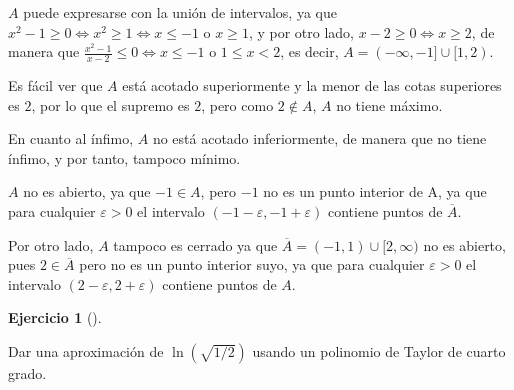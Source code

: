 \documentclass[
  spanish,
  a4paper,
]{scrreport}
\theoremstyle{definition}
\newtheorem{exercise}{Ejercicio}[chapter]
\theoremstyle{remark}
\begin{document}
\begin{tcolorbox}[enhanced jigsaw, arc=.35mm, bottomrule=.15mm, bottomtitle=1mm, breakable, colback=white, colbacktitle=quarto-callout-tip-color!10!white, colframe=quarto-callout-tip-color-frame, coltitle=black, left=2mm, leftrule=.75mm, opacityback=0, opacitybacktitle=0.6, rightrule=.15mm, title=\textcolor{quarto-callout-tip-color}{\faLightbulb}\hspace{0.5em}{Solución}, titlerule=0mm, toprule=.15mm, toptitle=1mm]

\(A\) puede expresarse con la unión de intervalos, ya que
\(x^2-1\geq 0 \Leftrightarrow x^2\geq 1 \Leftrightarrow x\leq -1 \mbox{ o } x\geq 1\),
y por otro lado, \(x-2\geq 0 \Leftrightarrow x\geq 2\), de manera que
\(\frac{x^2-1}{x-2}\leq 0 \Leftrightarrow x\leq -1\) o \(1\leq x<2\), es
decir, \(A=(-\infty,-1]\cup [1,2)\).

Es fácil ver que \(A\) está acotado superiormente y la menor de las
cotas superiores es \(2\), por lo que el supremo es \(2\), pero como
\(2\not\in A\), \(A\) no tiene máximo.

En cuanto al ínfimo, \(A\) no está acotado inferiormente, de manera que
no tiene ínfimo, y por tanto, tampoco mínimo.

\(A\) no es abierto, ya que \(-1\in A\), pero \(-1\) no es un punto
interior de A, ya que para cualquier \(\varepsilon>0\) el intervalo
\((-1-\varepsilon,-1+\varepsilon)\) contiene puntos de \(\overline{A}\).

Por otro lado, \(A\) tampoco es cerrado ya que
\(\overline{A}=(-1,1)\cup [2,\infty)\) no es abierto, pues
\(2\in\overline{A}\) pero no es un punto interior suyo, ya que para
cualquier \(\varepsilon>0\) el intervalo
\((2-\varepsilon,2+\varepsilon)\) contiene puntos de \(A\).

\end{tcolorbox}

\begin{exercise}[]\protect\hypertarget{exr-6}{}\label{exr-6}

Dar una aproximación de \(\ln(\sqrt{1/2})\) usando un polinomio de
Taylor de cuarto grado.

\end{exercise}
\end{document}
